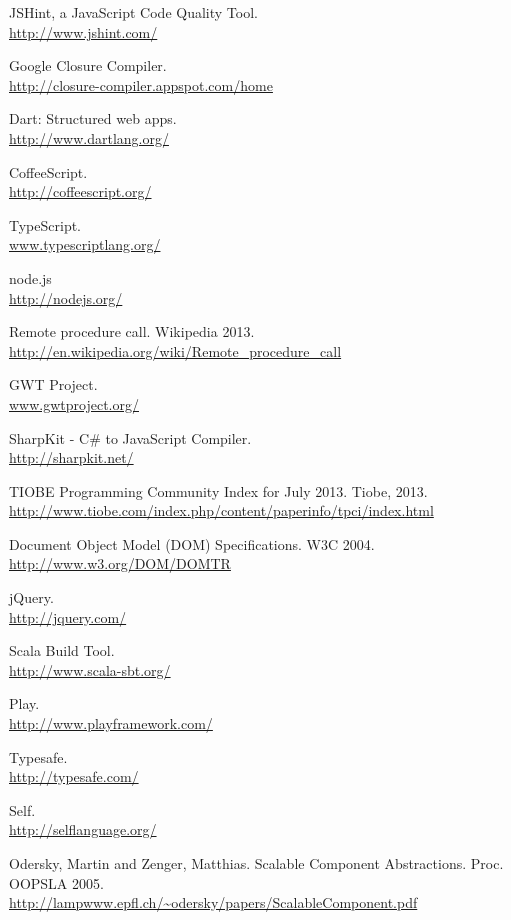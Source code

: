 \begin{thebibliography}{99}
	JSHint, a JavaScript Code Quality Tool.\\
	\url{http://www.jshint.com/}

	Google Closure Compiler.\\
	\url{http://closure-compiler.appspot.com/home}
	
	Dart: Structured web apps.\\
	\url{http://www.dartlang.org/}
	
	CoffeeScript.\\
	\url{http://coffeescript.org/}
	
	TypeScript.\\
	\url{www.typescriptlang.org/}
	
	node.js\\
	\url{http://nodejs.org/}
	
	Remote procedure call. Wikipedia 2013.\\
	\url{http://en.wikipedia.org/wiki/Remote\_procedure\_call}
	
	GWT Project.\\
	\url{www.gwtproject.org/}
	
	SharpKit - C\# to JavaScript Compiler.\\
	\url{http://sharpkit.net/}
	
	TIOBE Programming Community Index for July 2013. Tiobe, 2013.\\
	\url{http://www.tiobe.com/index.php/content/paperinfo/tpci/index.html}
	
	Document Object Model (DOM) Specifications. W3C 2004.\\
	\url{http://www.w3.org/DOM/DOMTR}
		
	jQuery.\\
	\url{http://jquery.com/}
	
	Scala Build Tool.\\
	\url{http://www.scala-sbt.org/}
	
	Play.\\
	\url{http://www.playframework.com/}
	
	Typesafe.\\
	\url{http://typesafe.com/}
	
	Self.\\
	\url{http://selflanguage.org/}
	
	{\sc Odersky,} Martin and {\sc Zenger,} Matthias. Scalable Component Abstractions. Proc. OOPSLA 2005.\\
	\url{http://lampwww.epfl.ch/~odersky/papers/ScalableComponent.pdf}
	

\end{thebibliography}
